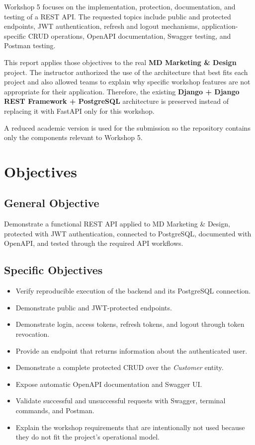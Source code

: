 \documentclass[11pt,a4paper]{article}
\begin{document}
Workshop 5 focuses on the implementation, protection, documentation, and testing of a REST API. The requested topics include public and protected endpoints, JWT authentication, refresh and logout mechanisms, application-specific CRUD operations, OpenAPI documentation, Swagger testing, and Postman testing.

This report applies those objectives to the real \textbf{MD Marketing \& Design} project. The instructor authorized the use of the architecture that best fits each project and also allowed teams to explain why specific workshop features are not appropriate for their application. Therefore, the existing \textbf{Django + Django REST Framework + PostgreSQL} architecture is preserved instead of replacing it with FastAPI only for this workshop.

A reduced academic version is used for the submission so the repository contains only the components relevant to Workshop 5.

\section{Objectives}

\subsection{General Objective}

Demonstrate a functional REST API applied to MD Marketing \& Design, protected with JWT authentication, connected to PostgreSQL, documented with OpenAPI, and tested through the required API workflows.

\subsection{Specific Objectives}

\begin{itemize}[leftmargin=*]
    \item Verify reproducible execution of the backend and its PostgreSQL connection.
    \item Demonstrate public and JWT-protected endpoints.
    \item Demonstrate login, access tokens, refresh tokens, and logout through token revocation.
    \item Provide an endpoint that returns information about the authenticated user.
    \item Demonstrate a complete protected CRUD over the \textit{Customer} entity.
    \item Expose automatic OpenAPI documentation and Swagger UI.
    \item Validate successful and unsuccessful requests with Swagger, terminal commands, and Postman.
    \item Explain the workshop requirements that are intentionally not used because they do not fit the project's operational model.
\end{itemize}
\end{document}
